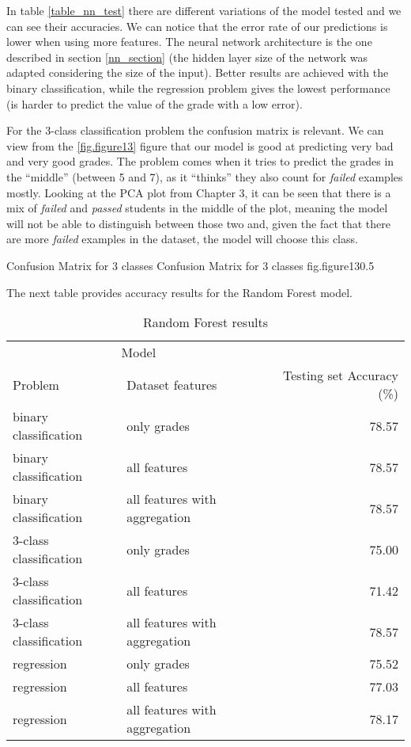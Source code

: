 In table \ref{table_nn_test} there are different variations of the model tested 
and we can see their accuracies. We can notice that the error rate of our 
predictions is lower when using more features. The neural network architecture is 
the one described in section \ref{nn_section} (the hidden layer size of the 
network was adapted considering the size of the input). Better results are 
achieved with the binary classification, while the regression problem gives 
the lowest performance (is harder to predict the value of the grade with a 
low error). 

For the 3-class classification problem the confusion matrix is relevant. 
We can view from the \ref{fig.figure13} figure that our model is good at predicting 
very bad and very good grades. The problem comes when it tries to predict the 
grades in the ``middle'' (between 5 and 7), as it ``thinks'' they also count 
for {\it failed} examples mostly. Looking at the PCA plot from Chapter 3, 
it can be seen that there is a mix of {\it failed} and {\it passed} students 
in the middle of the plot, meaning the model will not be able to distinguish 
between those two and, given the fact that there are more {\it failed} examples 
in the dataset, the model will choose this class.

%
    {Confusion Matrix for 3 classes}%
    {Confusion Matrix for 3 classes}%
    {fig.figure13}{0.5}

The next table provides accuracy results for the Random Forest model. 

\begin{table}[ht]
\centering
\begin{tabular}{llr}  
\toprule
\multicolumn{2}{c}{Model} \\
\cmidrule(r){1-2}
Problem                    & Dataset features               & Testing set Accuracy (\%) \\
\midrule
binary classification      & only grades                    & 78.57      \\
binary classification      & all features                   & 78.57      \\
binary classification      & all features with aggregation  & 78.57      \\
3-class classification     & only grades                    & 75.00      \\
3-class classification     & all features                   & 71.42      \\
3-class classification     & all features with aggregation  & 78.57      \\
regression                 & only grades                    & 75.52      \\
regression                 & all features                   & 77.03      \\
regression                 & all features with aggregation  & 78.17      \\
\bottomrule
\end{tabular}
\caption[Randon Forest results]{Random Forest results}
\label{table_rf_test}
\end{table}

